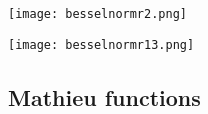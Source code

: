 \texttt{[image: besselnormr2.png]}

\texttt{[image: besselnormr13.png]}


\subsection{Mathieu functions}

